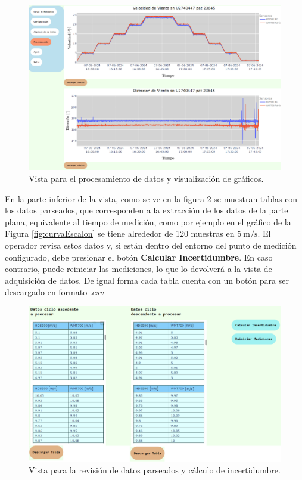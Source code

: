 \begin{figure}[H]
    \centering
    \includegraphics[width=1\linewidth]{Figuras/AplicacionWeb/frontend/procesarDatos1.png}
    \caption{Vista para el procesamiento de datos y visualización de gráficos.}
    \label{fig:procesarDatos1}
\end{figure}

En la parte inferior de la vista, como se ve en la figura \ref{fig:procesarDatos2} se muestran tablas con los datos parseados, que corresponden a la extracción de los datos de la parte plana, equivalente al tiempo de medición, como por ejemplo en el gráfico de la Figura \ref{fig:curvaEscalon} se tiene alrededor de 120 muestras en $\SI{5}{\meter\per\second}$. El operador revisa estos datos y, si están dentro del entorno del punto de medición configurado, debe presionar el botón \textbf{Calcular Incertidumbre}. En caso contrario, puede reiniciar las mediciones, lo que lo devolverá a la vista de adquisición de datos. De igual forma cada tabla cuenta con un botón para ser descargado en formato $.csv$

\begin{figure}[H]
    \centering
    \includegraphics[width=0.9\linewidth]{Figuras/AplicacionWeb/frontend/procesarDatos2.png}
    \caption{Vista para la revisión de datos parseados y cálculo de incertidumbre.}
    \label{fig:procesarDatos2}
\end{figure}



